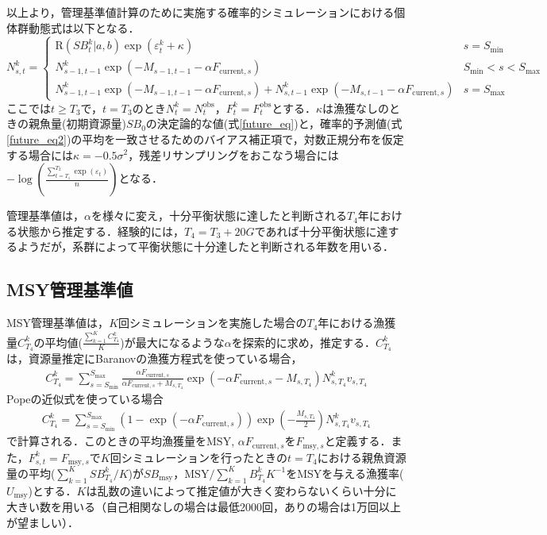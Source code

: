 \documentclass[11pt]{jsarticle}
\begin{document}
以上より，管理基準値計算のために実施する確率的シミュレーションにおける個体群動態式は以下となる．
\begin{equation}
  N_{s,t}^k = \begin{cases}
    \mathrm{R}(S\!B_{t}^k|a,b) \exp (\varepsilon_t^k + \kappa) &     s = S_\mathrm{min} \\    
    N_{s-1, t-1}^k  \exp(-M_{s-1,t-1}-\alpha F_{\mathrm{current},s} )  &    S_\mathrm{min} < s < S_\mathrm{max} \\
    N_{s-1, t-1}^k  \exp(-M_{s-1,t-1}-\alpha F_{\mathrm{current},s} ) + N_{s,t-1}^k  \exp(-M_{s,t-1} - \alpha F_{\mathrm{current},s} ) &   s=S_{\mathrm{max}}
  \end{cases}
  \label{future_eq2}
\end{equation}
ここでは$t \geq T_3$で，$t=T_3$のとき$N_t^k=N_t^{\mathrm{obs}}$，$F_t^k=F_t^{\mathrm{obs}}$とする．$\kappa$は漁獲なしのときの親魚量(初期資源量)$S\!B_0$の決定論的な値(式\ref{future_eq})と，確率的予測値(式\ref{future_eq2})の平均を一致させるためのバイアス補正項で，対数正規分布を仮定する場合には$\kappa=-0.5\sigma^2$，残差リサンプリングをおこなう場合には$-\log( \frac{\sum_{t=T_1}^{T_2} \exp(\varepsilon_t)}{n} )$となる．

管理基準値は，$\alpha$を様々に変え，十分平衡状態に達したと判断される$T_4$年における状態から推定する．経験的には，$T_4=T_3+20G$であれば十分平衡状態に達するようだが，系群によって平衡状態に十分達したと判断される年数を用いる．

\subsection{MSY管理基準値}
MSY管理基準値は，$K$回シミュレーションを実施した場合の$T_4$年における漁獲量$C_{T_4}^k$の平均値($\frac{\sum_{k=1}^K C_{T_4}^k}{K}$)が最大になるような$\alpha$を探索的に求め，推定する．$C_{T_4}^k$は，資源量推定にBaranovの漁獲方程式を使っている場合，
\begin{eqnarray}
  C_{T_4}^k=\sum_{s=S_{\mathrm{min}}}^{S_{\mathrm{max}}} \frac{\alpha F_{\mathrm{current},s}}{\alpha F_{\mathrm{current},s}+M_{s,T_4}}
  \exp(-\alpha F_{\mathrm{current},s}-M_{s,T_4}) N_{s,T_4}^k v_{s,T_4}
\end{eqnarray}
Popeの近似式を使っている場合
\begin{eqnarray}
  C_{T_4}^k=\sum_{s=S_{\mathrm{min}}}^{S_{\mathrm{max}}} (1-\exp(-\alpha F_{\mathrm{current},s})) \exp(-\frac{M_{s,T_4}}{2})N_{s,T_4}^k v_{s,T_4} 
\end{eqnarray}
で計算される．このときの平均漁獲量を$\mathrm{MSY}$, $\alpha F_{\mathrm{current},s}$を$F_{\mathrm{msy},s}$と定義する．また，$F_{s,t}^k=F_{\mathrm{msy},s}$で$K$回シミュレーションを行ったときの$t=T_4$における親魚資源量の平均($\sum_{k=1}^K S\!B_{T_4}^k /K$)が$S\!B_{\mathrm{msy}}$，$\mathrm{MSY}/ \sum_{k=1}^K B_{T_4}^k K^{-1}$をMSYを与える漁獲率($U_{\mathrm{msy}}$)とする．$K$は乱数の違いによって推定値が大きく変わらないくらい十分に大きい数を用いる（自己相関なしの場合は最低2000回，ありの場合は1万回以上が望ましい）．
\end{document}
